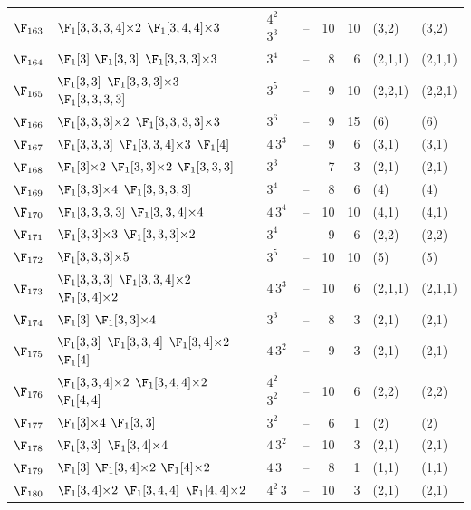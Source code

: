 \begin{landscape}
{\begin{longtable}{@{}l p{8.2cm} l l r r l l@{}}
$\F_{163}$ & $\F_{1}[3,3,3,4]{\times}2$\; $\F_{1}[3,4,4]{\times}3$ & $4^{2}$\,$3^{3}$ & -- & 10 & 10 & (3,2) & (3,2) \\
$\F_{164}$ & $\F_{1}[3]$\; $\F_{1}[3,3]$\; $\F_{1}[3,3,3]{\times}3$ & $3^{4}$ & -- & 8 & 6 & (2,1,1) & (2,1,1) \\
$\F_{165}$ & $\F_{1}[3,3]$\; $\F_{1}[3,3,3]{\times}3$\; $\F_{1}[3,3,3,3]$ & $3^{5}$ & -- & 9 & 10 & (2,2,1) & (2,2,1) \\
$\F_{166}$ & $\F_{1}[3,3,3]{\times}2$\; $\F_{1}[3,3,3,3]{\times}3$ & $3^{6}$ & -- & 9 & 15 & (6) & (6) \\
$\F_{167}$ & $\F_{1}[3,3,3]$\; $\F_{1}[3,3,4]{\times}3$\; $\F_{1}[4]$ & $4$\,$3^{3}$ & -- & 9 & 6 & (3,1) & (3,1) \\
$\F_{168}$ & $\F_{1}[3]{\times}2$\; $\F_{1}[3,3]{\times}2$\; $\F_{1}[3,3,3]$ & $3^{3}$ & -- & 7 & 3 & (2,1) & (2,1) \\
$\F_{169}$ & $\F_{1}[3,3]{\times}4$\; $\F_{1}[3,3,3,3]$ & $3^{4}$ & -- & 8 & 6 & (4) & (4) \\
$\F_{170}$ & $\F_{1}[3,3,3,3]$\; $\F_{1}[3,3,4]{\times}4$ & $4$\,$3^{4}$ & -- & 10 & 10 & (4,1) & (4,1) \\
$\F_{171}$ & $\F_{1}[3,3]{\times}3$\; $\F_{1}[3,3,3]{\times}2$ & $3^{4}$ & -- & 9 & 6 & (2,2) & (2,2) \\
$\F_{172}$ & $\F_{1}[3,3,3]{\times}5$ & $3^{5}$ & -- & 10 & 10 & (5) & (5) \\
$\F_{173}$ & $\F_{1}[3,3,3]$\; $\F_{1}[3,3,4]{\times}2$\; $\F_{1}[3,4]{\times}2$ & $4$\,$3^{3}$ & -- & 10 & 6 & (2,1,1) & (2,1,1) \\
$\F_{174}$ & $\F_{1}[3]$\; $\F_{1}[3,3]{\times}4$ & $3^{3}$ & -- & 8 & 3 & (2,1) & (2,1) \\
$\F_{175}$ & $\F_{1}[3,3]$\; $\F_{1}[3,3,4]$\; $\F_{1}[3,4]{\times}2$\; $\F_{1}[4]$ & $4$\,$3^{2}$ & -- & 9 & 3 & (2,1) & (2,1) \\
$\F_{176}$ & $\F_{1}[3,3,4]{\times}2$\; $\F_{1}[3,4,4]{\times}2$\; $\F_{1}[4,4]$ & $4^{2}$\,$3^{2}$ & -- & 10 & 6 & (2,2) & (2,2) \\
$\F_{177}$ & $\F_{1}[3]{\times}4$\; $\F_{1}[3,3]$ & $3^{2}$ & -- & 6 & 1 & (2) & (2) \\
$\F_{178}$ & $\F_{1}[3,3]$\; $\F_{1}[3,4]{\times}4$ & $4$\,$3^{2}$ & -- & 10 & 3 & (2,1) & (2,1) \\
$\F_{179}$ & $\F_{1}[3]$\; $\F_{1}[3,4]{\times}2$\; $\F_{1}[4]{\times}2$ & $4$\,$3$ & -- & 8 & 1 & (1,1) & (1,1) \\
$\F_{180}$ & $\F_{1}[3,4]{\times}2$\; $\F_{1}[3,4,4]$\; $\F_{1}[4,4]{\times}2$ & $4^{2}$\,$3$ & -- & 10 & 3 & (2,1) & (2,1) \\

\end{longtable}}
\end{landscape}
